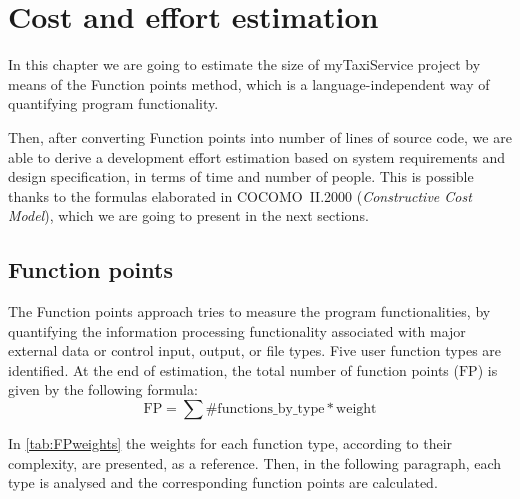 \chapter{Cost and effort estimation}\label{chap:estimation}

In this chapter we are going to estimate the size of myTaxiService project by means of the Function points method, which is a language-independent way of quantifying program functionality.

Then, after converting Function points into number of lines of source code, we are able to derive a development effort estimation based on system requirements and design specification, in terms of time and number of people. This is possible thanks to the formulas elaborated in \mbox{COCOMO II.2000} (\emph{Constructive Cost Model}), which we are going to present in the next sections.


\newcommand{\mSize}{\mathbf{s}}
\newcommand{\mFP}{\text{FP}}
\newcommand{\mEffort}{\mathbf{e}}
\newcommand{\eaf}{\text{EAF}}  %
\newcommand{\myW}{1.5cm}


\section{Function points}

The Function points approach tries to measure the program functionalities, by quantifying the information processing functionality associated with major external data or control input, output, or file types. Five user function types are identified. At the end of estimation, the total number of function points ($ \mFP $) is given by the following formula:
\begin{equation}
\mFP = \sum \text{\#functions\_by\_type} * \text{weight} \label{eqn:fp}
\end{equation}


In \cref{tab:FPweights} the weights for each function type, according to their complexity, are presented, as a reference. Then, in the following paragraph, each type is analysed and the corresponding function points are calculated.


